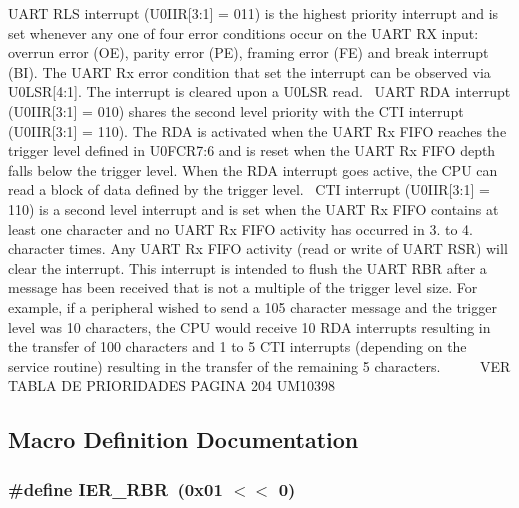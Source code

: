 U\+A\+RT R\+LS interrupt (U0\+I\+IR\mbox{[}3\+:1\mbox{]} = 011) is the highest priority interrupt and is set whenever any one of four error conditions occur on the U\+A\+RT RX input\+: overrun error (OE), parity error (PE), framing error (FE) and break interrupt (BI). The U\+A\+RT Rx error condition that set the interrupt can be observed via U0\+L\+SR\mbox{[}4\+:1\mbox{]}. The interrupt is cleared upon a U0\+L\+SR read.~\newline
 U\+A\+RT R\+DA interrupt (U0\+I\+IR\mbox{[}3\+:1\mbox{]} = 010) shares the second level priority with the C\+TI interrupt (U0\+I\+IR\mbox{[}3\+:1\mbox{]} = 110). The R\+DA is activated when the U\+A\+RT Rx F\+I\+FO reaches the trigger level defined in U0\+F\+C\+R7\+:6 and is reset when the U\+A\+RT Rx F\+I\+FO depth falls below the trigger level. When the R\+DA interrupt goes active, the C\+PU can read a block of data defined by the trigger level.~\newline
 C\+TI interrupt (U0\+I\+IR\mbox{[}3\+:1\mbox{]} = 110) is a second level interrupt and is set when the U\+A\+RT Rx F\+I\+FO contains at least one character and no U\+A\+RT Rx F\+I\+FO activity has occurred in 3. to 4. character times. Any U\+A\+RT Rx F\+I\+FO activity (read or write of U\+A\+RT R\+SR) will clear the interrupt. This interrupt is intended to flush the U\+A\+RT R\+BR after a message has been received that is not a multiple of the trigger level size. For example, if a peripheral wished to send a 105 character message and the trigger level was 10 characters, the C\+PU would receive 10 R\+DA interrupts resulting in the transfer of 100 characters and 1 to 5 C\+TI interrupts (depending on the service routine) resulting in the transfer of the remaining 5 characters. ~\newline
~\newline
~\newline
 V\+ER T\+A\+B\+LA DE P\+R\+I\+O\+R\+I\+D\+A\+D\+ES P\+A\+G\+I\+NA 204 U\+M10398 

\subsection{Macro Definition Documentation}
\subsubsection[{\texorpdfstring{I\+E\+R\+\_\+\+R\+BR}{IER_RBR}}]{\setlength{\rightskip}{0pt plus 5cm}\#define I\+E\+R\+\_\+\+R\+BR~(0x01 $<$$<$ 0)}\hypertarget{group___r_e_g_i_s_t_r_o___i_e_r_ga6f8e43123ccd9f9be70e2e4e761fd8bf}{}\label{group___r_e_g_i_s_t_r_o___i_e_r_ga6f8e43123ccd9f9be70e2e4e761fd8bf}


